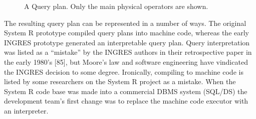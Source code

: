 \documentclass[a4paper,11pt,twoside,openright]{book}
\begin{document}
\begin{figure}
\centering
\centering
{}

\caption{A Query plan. Only the main physical operators are shown.\label{fig-4-1}}
\end{figure}

The resulting query plan can be represented in a number of ways. The
original System R prototype compiled query plans into machine code,
whereas the early INGRES prototype generated an interpretable query
plan. Query interpretation was listed as a ``mistake'' by the INGRES
authors in their retrospective paper in the early 1980's {[}85{]}, but
Moore's law and software engineering have vindicated the INGRES decision
to some degree. Ironically, compiling to machine code is listed by some
researchers on the System R project as a mistake. When the System R code
base was made into a commercial DBMS system
(SQL/DS) the development team's first change was to replace the machine
code executor with an interpreter.
\end{document}
